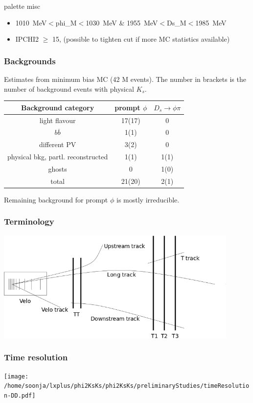 \documentclass{beamer}
\newcommand{\backupend}{
   \addtocounter{framenumbervorappendix}{-\value{framenumber}}
   \addtocounter{framenumber}{\value{framenumbervorappendix}} 
 }
\begin{document}
\begin{frame}[fragile]
\begin{beamercolorbox}[rounded=true,shadow=true]{palette misc}
\begin{itemize}
\begin{columns}
\begin{column}{.48\textwidth}
\end{column}
\end{columns}

\item \SI{1010}{MeV}$<$phi\_M$<$\SI{1030}{MeV} \& \SI{1955}{MeV}$<$Ds\_M$<$\SI{1985}{MeV}
\item IPCHI2 $\geq$ 15,\small{ (possible to tighten cut if more MC statistics available)}
\end{itemize}
\end{beamercolorbox}




\end{frame}


\begin{frame}[fragile]
\frametitle{Backgrounds}
Estimates from minimum bias MC (42 M events). The number in brackets is the number of background events with physical $K_s$.
\begin{center}
\begin{tabular}{c|c|c}
Background category & prompt $\phi$ & $D_s \rightarrow \phi \pi$ \\ 
\hline 
light flavour & 17(17) & 0 \\ 
$b\overline{b}$ & 1(1) & 0 \\ 
different PV & 3(2) & 0 \\ 
physical bkg, partl. reconstructed & 1(1) & 1(1) \\ 
ghosts & 0 & 1(0) \\ 
\hline 
total & 21(20) & 2(1) \\  
\end{tabular} 
\end{center}
Remaining background for prompt $\phi$ is mostly irreducible.

\end{frame}

\begin{frame}[fragile]
\frametitle{Terminology}

\begin{center}
\includegraphics[width = 0.9\textwidth]{tracktypes.png}
\end{center}
\end{frame}

\begin{frame}[fragile]
\frametitle{Time resolution}

\begin{center}
\texttt{[image: /home/soonja/lxplus/phi2KsKs/phi2KsKs/preliminaryStudies/timeResolution-DD.pdf]}
\end{center}

\end{frame}

\backupend
\end{document}
